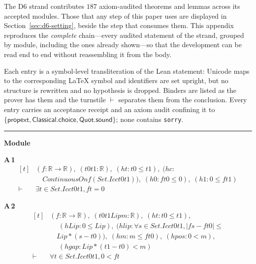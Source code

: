 The D6 strand contributes $187$ axiom-audited theorems and lemmas across its accepted modules. Those that any step of this paper uses are displayed in Section~\ref{sec:d6-setting}, beside the step that consumes them. This appendix reproduces the \emph{complete} chain---every audited statement of the strand, grouped by module, including the ones already shown---so that the development can be read end to end without reassembling it from the body.

Each entry is a symbol-level transliteration of the Lean statement: Unicode maps to the corresponding \LaTeX{} symbol and identifiers are set upright, but no structure is rewritten and no hypothesis is dropped. Binders are listed as the prover has them and the turnstile $\vdash$ separates them from the conclusion. Every entry carries an acceptance receipt and an axiom audit confining it to $\{\textsf{propext},\textsf{Classical.choice},\textsf{Quot.sound}\}$; none contains \texttt{sorry}.

\vspace{4pt}\noindent\rule{\columnwidth}{0.4pt}\par\vspace{2pt}
\noindent\textbf{Module }\par\vspace{3pt}

\noindent\textbf{A\,1}\quad{}
{\footnotesize\[ \begin{aligned}[t]
&(\mathit{f} : \mathbb{R} \to \mathbb{R} ),\; (\mathit{t0} \mathit{t1} : \mathbb{R} ),\; (\mathit{ht} : \mathit{t0} \leq \mathit{t1}),\; (\mathit{hc} :\\
&\quad \mathit{ContinuousOn} \mathit{f} (\mathit{Set}.\mathit{Icc} \mathit{t0} \mathit{t1})),\; (\mathit{h0} : \mathit{f} \mathit{t0} \leq 0),\; (\mathit{h1} : 0 \leq \mathit{f} \mathit{t1})\\
\vdash\;&\exists \mathit{t} \in \mathit{Set}.\mathit{Icc} \mathit{t0} \mathit{t1}, \mathit{f} \mathit{t} = 0
\end{aligned} \]}

\noindent\textbf{A\,2}\quad{}
{\footnotesize\[ \begin{aligned}[t]
&(\mathit{f} : \mathbb{R} \to \mathbb{R} ),\; (\mathit{t0} \mathit{t1} \mathit{Lip} \mathit{m} : \mathbb{R} ),\; (\mathit{ht} : \mathit{t0} \leq \mathit{t1}),\\
&\quad \; (\mathit{hLip} : 0 \leq \mathit{Lip}),\; (\mathit{hlip} : \forall \mathit{s} \in \mathit{Set}.\mathit{Icc} \mathit{t0} \mathit{t1}, |\mathit{f} \mathit{s} - \mathit{f} \mathit{t0}| \leq\\
&\quad \mathit{Lip} * (\mathit{s} - \mathit{t0})),\; (\mathit{hm} : \mathit{m} \leq \mathit{f} \mathit{t0}),\; (\mathit{hpos} : 0 < \mathit{m}),\\
&\quad \; (\mathit{hgap} : \mathit{Lip} * (\mathit{t1} - \mathit{t0}) < \mathit{m})\\
\vdash\;&\forall \mathit{t} \in \mathit{Set}.\mathit{Icc} \mathit{t0} \mathit{t1}, 0 < \mathit{f} \mathit{t}
\end{aligned} \]}

